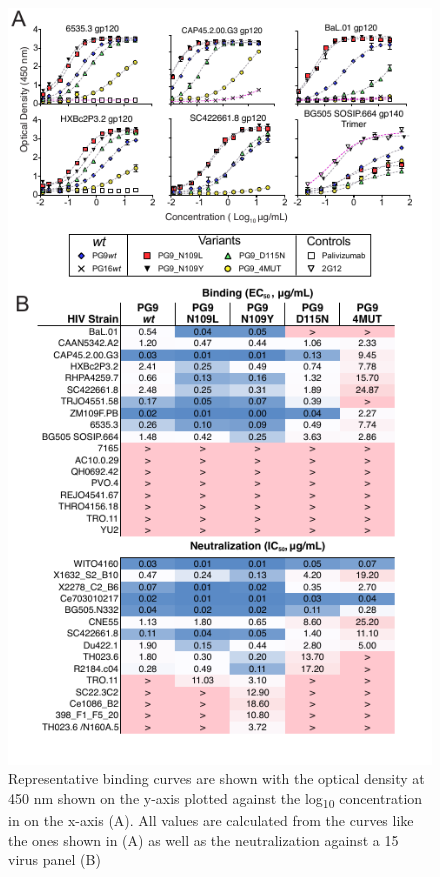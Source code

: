 \begin{figure}[!t]
   \centering
   \includegraphics{images/chapter4/figure4_4.pdf} %
   \caption[Experimental analysis of PG9 Variants]{Representative binding curves are shown with the optical density at 450 nm shown on the y-axis plotted against the log\textsubscript{10} concentration in \mcml on the x-axis (A). All \ec values are calculated from the curves like the ones shown in (A) as well as the neutralization \ic against a 15 virus panel (B)}
   \label{fig:figure4_4}
\end{figure} 


